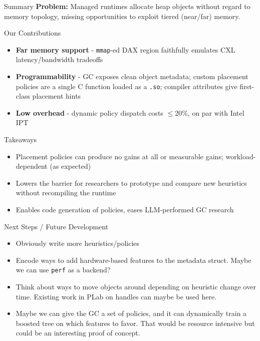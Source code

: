 \begin{frame}{Summary}
  \textbf{Problem:} Managed runtimes allocate heap objects without regard to memory topology, missing opportunities to exploit tiered (near/far) memory.

  \begin{block}{Our Contributions}
    \begin{itemize}[<+>]
      \item \textbf{Far memory support} - \texttt{mmap}-ed DAX region faithfully emulates CXL latency/bandwidth tradeoffs
      \item \textbf{Programmability} - GC exposes clean object metadata; custom placement policies are a single C function loaded as a \texttt{.so}; compiler attributes give first-class placement hints
      \item \textbf{Low overhead} - dynamic policy dispatch costs $\leq$20\%, on par with Intel IPT
    \end{itemize}
  \end{block}

  \begin{block}{Takeaways}
    \begin{itemize}[<+>]
      \item Placement policies can produce no gains at all or measurable gains; workload-dependent (as expected)
      \item Lowers the barrier for researchers to prototype and compare new heuristics without recompiling the runtime
      \item Enables code generation of policies, eases LLM-performed GC research
    \end{itemize}
  \end{block}
\end{frame}

\begin{frame}{Next Steps / Future Development}
  \begin{itemize}[<+>]
    \item Obviously write more heuristics/policies
    \item Encode ways to add hardware-based features to the metadata struct. Maybe we can use \texttt{perf} as a backend?
    \item Think about ways to move objects around depending on heuristic change over time. Existing work in PLab on handles can maybe be used here.
    \item Maybe we can give the GC a set of policies, and it can dynamically train a boosted tree on which features to favor. That would be resource intensive but could be an interesting proof of concept.
  \end{itemize}
\end{frame}
